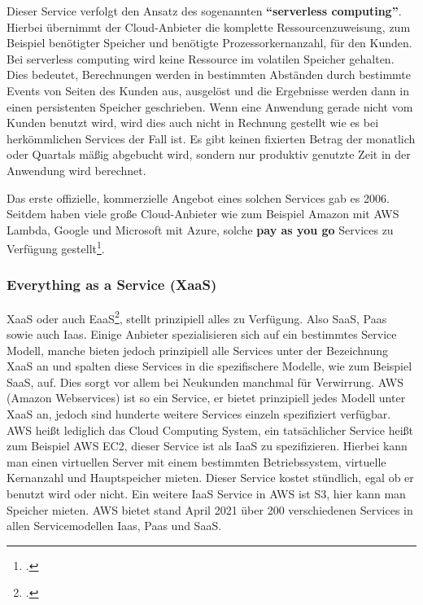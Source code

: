 Dieser Service verfolgt den Ansatz des sogenannten \textbf{"`serverless computing"'}. Hierbei übernimmt der Cloud-Anbieter die komplette Ressourcenzuweisung, zum Beispiel benötigter Speicher und benötigte Prozessorkernanzahl, für den Kunden. Bei serverless computing wird keine Ressource im volatilen Speicher gehalten. Dies bedeutet, Berechnungen werden in bestimmten Abständen durch bestimmte Events von Seiten des Kunden aus, ausgelöst und die Ergebnisse werden dann in einen persistenten Speicher geschrieben. Wenn eine Anwendung gerade nicht vom Kunden benutzt wird, wird dies auch nicht in Rechnung gestellt wie es bei herkömmlichen Services der Fall ist. Es gibt keinen fixierten Betrag der monatlich oder Quartals mäßig abgebucht wird, sondern nur produktiv genutzte Zeit in der Anwendung wird berechnet.

Das erste offizielle, kommerzielle Angebot eines solchen Services gab es 2006. Seitdem haben viele große Cloud-Anbieter wie zum Beispiel Amazon mit AWS Lambda, Google und Microsoft mit Azure, solche \textbf{pay as you go} Services zu Verfügung gestellt\footcite{cloud-computing}.



\subsubsection{Everything as a Service (XaaS)}
XaaS oder auch EaaS\footcite{cloud-eaas}, stellt prinzipiell alles zu Verfügung. Also SaaS, Paas sowie auch Iaas. Einige Anbieter spezialisieren sich auf ein bestimmtes Service Modell, manche bieten jedoch prinzipiell alle Services unter der Bezeichnung XaaS an und spalten diese Services in die spezifischere Modelle, wie zum Beispiel SaaS, auf. Dies sorgt vor allem bei Neukunden manchmal für Verwirrung. AWS (Amazon Webservices) ist so ein Service, er bietet prinzipiell jedes Modell unter XaaS an, jedoch sind hunderte weitere Services einzeln spezifiziert verfügbar. AWS heißt lediglich das Cloud Computing System, ein tatsächlicher Service heißt zum Beispiel AWS EC2, dieser Service ist als IaaS zu spezifizieren. Hierbei kann man einen virtuellen Server mit einem bestimmten Betriebssystem, virtuelle Kernanzahl und Hauptspeicher mieten. Dieser Service kostet stündlich, egal ob er benutzt wird oder nicht. Ein weitere IaaS Service in AWS ist S3, hier kann man Speicher mieten.\newline
AWS bietet stand April 2021 über 200 verschiedenen Services in allen Servicemodellen Iaas, Paas und SaaS.

